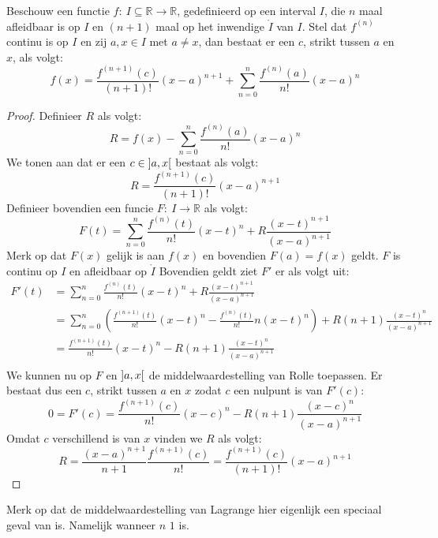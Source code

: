 \documentclass[main.tex]{subfiles}
\begin{document}
\begin{bst}
  \label{st:middelwaardestelling-taylor}
  Beschouw een functie $f:\ I \subseteq \mathbb{R} \rightarrow \mathbb{R}$, gedefinieerd op een interval $I$, die $n$ maal afleidbaar is op $I$ en $(n+1)$ maal op het inwendige $\mathring{I}$ van $I$.
  Stel dat $f^{(n)}$ continu is op $I$ en zij $a,x\in I$ met $a \neq x$, dan bestaat er een $c$, strikt tussen $a$ en $x$, als volgt:
  \[ 
  f(x) = \frac{f^{(n+1)}(c)}{(n+1)!}(x-a)^{n+1} + \sum_{n = 0}^{n}\frac{f^{(n)}(a)}{n!}(x-a)^{n} 
  \]

  \begin{proof}
    Definieer $R$ als volgt:
    \[ R = f(x) -  \sum_{n = 0}^{n}\frac{f^{(n)}(a)}{n!}(x-a)^{n}  \]
    We tonen aan dat er een $c\in \interval[open]{a}{x}$ bestaat als volgt:
    \[ R = \frac{f^{(n+1)}(c)}{(n+1)!}(x-a)^{n+1} \]
    Definieer bovendien een funcie $F:\ I \rightarrow \mathbb{R}$ als volgt:
    \[ F(t) = \sum_{n = 0}^{n}\frac{f^{(n)}(t)}{n!}(x-t)^{n} + R\frac{(x-t)^{n+1}}{(x-a)^{n+1}} \]
    Merk op dat $F(x)$ gelijk is aan $f(x)$ en bovendien $F(a) = f(x)$ geldt.
    $F$ is continu op $I$ en afleidbaar op $\mathring{I}$ \waarom
    Bovendien geldt ziet $F'$ er als volgt uit:
    \[
    \begin{array}{rl}
      F'(t)
      &= \sum_{n = 0}^{n}\frac{f^{(n)}(t)}{n!}(x-t)^{n} + R\frac{(x-t)^{n+1}}{(x-a)^{n+1}} \\
      &= \sum_{n = 0}^{n}\left(\frac{f^{(n+1)}(t)}{n!}(x-t)^{n} - \frac{f^{(n)}(t)}{n!}n(x-t)^{n}\right)+  R(n+1)\frac{(x-t)^{n}}{(x-a)^{n+1}}\\
      &= \frac{f^{(n+1)}(t)}{n!}(x-t)^{n} - R(n+1)\frac{(x-t)^{n}}{(x-a)^{n+1}}\\
    \end{array}
    \]
    We kunnen nu op $F$ en $\interval[open]{a}{x}$ de middelwaardestelling van Rolle toepassen.
    Er bestaat dus een $c$, strikt tussen $a$ en $x$ zodat $c$ een nulpunt is van $F'(c)$:
    \[ 0 = F'(c) = \frac{f^{(n+1)}(c)}{n!}(x-c)^{n} - R(n+1)\frac{(x-c)^{n}}{(x-a)^{n+1}} \]
    Omdat $c$ verschillend is van $x$ vinden we $R$ als volgt:
    \[ R = \frac{(x-a)^{n+1}}{n+1}\frac{f^{(n+1)}(c)}{n!} = \frac{f^{(n+1)}(c)}{(n+1)!}(x-a)^{n+1} \]
  \end{proof}
\end{bst}

\begin{opm}
  Merk op dat de middelwaardestelling van Lagrange hier eigenlijk een speciaal geval van is.
  Namelijk wanneer $n$ $1$ is.
\end{opm}
\end{document}
